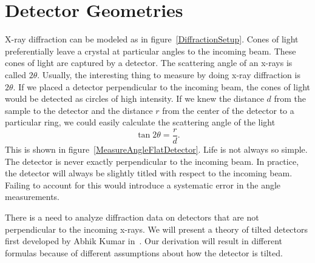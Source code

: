 \chapter{Detector Geometries}\label{theory_chapter}

X-ray diffraction can be modeled as in figure~\ref{DiffractionSetup}. 
Cones of light preferentially leave a crystal at particular angles to 
the incoming beam. These cones of light are 
captured by a detector. The scattering angle 
of an x-rays is called 
$2\theta$. Usually, the interesting thing to measure by doing x-ray 
diffraction is $2\theta$. If we placed a detector perpendicular 
to the incoming beam, the cones of light would be detected as 
circles of high intensity. 
If we knew the distance $d$ from the sample to the detector and 
the distance $r$ from the center of the detector to a 
particular ring, we could easily calculate the scattering angle 
of the light 
\begin{equation}
    \tan2\theta = \frac{r}{d}.
\end{equation}
This is shown in figure~\ref{MeasureAngleFlatDetector}. 
Life is not always so simple. The detector is never
exactly perpendicular to the incoming beam.  In practice, 
the detector will always be slightly titled with respect 
to the incoming beam. Failing to account for this would
introduce a systematic error in the angle measurements.

\begin{SCfigure}[1][htbp]
    \centering
    
    \caption{An X-Ray diffraction setup. X-rays scatter from a 
    3-D sample and are captured by a 2-D detector. In this 
    setup, the detector is perpendicular to the incoming 
    x-ray beam.}
    \label{DiffractionSetup}
\end{SCfigure}

\begin{SCfigure}[1][htbp]
    \centering
    
    \caption{The same setup as in figure~\ref{DiffractionSetup}. 
    $2\theta$ is the scattering angle of the light,
    $d$ is the distance 
    from the crystal to the detector, and $r$ is the distance 
    from the center of the detector.}
    \label{MeasureAngleFlatDetector}
\end{SCfigure}

There is a need to analyze diffraction data on detectors that are 
not perpendicular to the incoming x-rays. We will present a 
theory of tilted detectors first developed by Abhik Kumar 
in~\cite{Kumar05}. Our derivation will result in 
different formulas because of different assumptions
about how the detector is tilted. 

